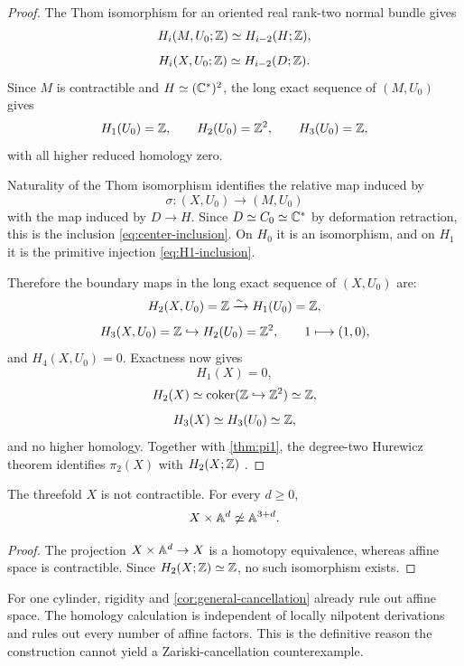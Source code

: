 \begin{proof}
The Thom isomorphism for an oriented real rank-two normal bundle \cite[Chapter VI]{Bredon1993} gives
\begin{equation}\label{eq:thom-M}
  H_i(M,U_0;\mathbb Z)\simeq H_{i-2}(H;\mathbb Z),
\end{equation}
\begin{equation}\label{eq:thom-X}
  H_i(X,U_0;\mathbb Z)\simeq H_{i-2}(D;\mathbb Z).
\end{equation}
Since $M$ is contractible and $H\simeq(\mathbb C^*)^2$, the long exact sequence of $(M,U_0)$ gives
\begin{equation}\label{eq:U-homology}
  H_1(U_0)=\mathbb Z,
  \qquad
  H_2(U_0)=\mathbb Z^2,
  \qquad
  H_3(U_0)=\mathbb Z,
\end{equation}
with all higher reduced homology zero.

Naturality of the Thom isomorphism identifies the relative map induced by
\[
  \sigma\colon(X,U_0)\longrightarrow(M,U_0)
\]
with the map induced by $D\to H$.  Since $D\simeq C_0\simeq\mathbb C^*$ by deformation retraction, this is the inclusion \eqref{eq:center-inclusion}.  On $H_0$ it is an isomorphism, and on $H_1$ it is the primitive injection \eqref{eq:H1-inclusion}.

Therefore the boundary maps in the long exact sequence of $(X,U_0)$ are:
\[
  H_2(X,U_0)=\mathbb Z\xrightarrow{\sim}H_1(U_0)=\mathbb Z,
\]
\[
  H_3(X,U_0)=\mathbb Z\hookrightarrow H_2(U_0)=\mathbb Z^2,
  \qquad 1\longmapsto(1,0),
\]
and $H_4(X,U_0)=0$.  Exactness now gives
\[
  H_1(X)=0,
\]
\[
  H_2(X)\simeq\operatorname{coker}(\mathbb Z\hookrightarrow\mathbb Z^2)\simeq\mathbb Z,
\]
\[
  H_3(X)\simeq H_3(U_0)\simeq\mathbb Z,
\]
and no higher homology.  Together with \cref{thm:pi1}, the degree-two Hurewicz theorem identifies $\pi_2(X)$ with $H_2(X;\mathbb Z)$ \cite[Section 4.2]{Hatcher2002}.
\end{proof}

\begin{corollary}\label{cor:all-cylinders}
The threefold $X$ is not contractible.  For every $d\geq0$,
\[
  X\times\mathbb A^d\not\simeq\mathbb A^{3+d}.
\]
\end{corollary}

\begin{proof}
The projection $X\times\mathbb A^d\to X$ is a homotopy equivalence, whereas affine space is contractible.  Since $H_2(X;\mathbb Z)\simeq\mathbb Z$, no such isomorphism exists.
\end{proof}

\begin{remark}\label{rem:two-obstructions}
For one cylinder, rigidity and \cref{cor:general-cancellation} already rule out affine space.  The homology calculation is independent of locally nilpotent derivations and rules out every number of affine factors.  This is the definitive reason the construction cannot yield a Zariski-cancellation counterexample.
\end{remark}

